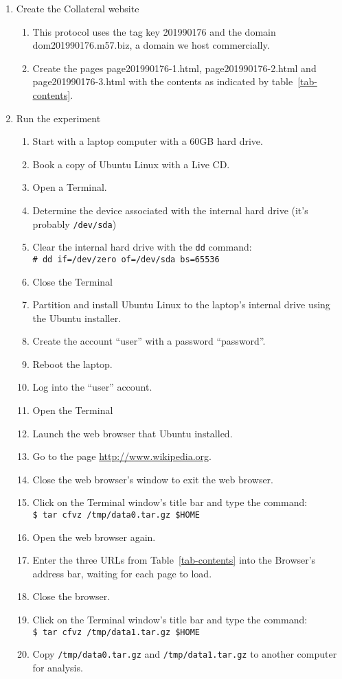 \begin{enumerate}
\item Create the Collateral website
\begin{enumerate}
\item This protocol uses the tag key 201990176 and the domain
  dom201990176.m57.biz, a domain we host commercially.
\item Create the pages page201990176-1.html, page201990176-2.html and
  page201990176-3.html with the contents as indicated by table~\ref{tab-contents}.
\end{enumerate}
\item Run the experiment
\begin{enumerate}
\item Start with a laptop computer with a 60GB hard drive.
\item Book a copy of Ubuntu Linux with a Live CD.
\item Open a Terminal. 
\item Determine the device associated with the internal hard drive
  (it's probably \verb+/dev/sda+)
\item Clear the internal hard drive with the \texttt{dd} command:\\
      \verb+# dd if=/dev/zero of=/dev/sda bs=65536+
\item Close the Terminal
\item Partition and install Ubuntu Linux to the laptop's internal
  drive using the Ubuntu installer.
\item Create the account ``user'' with a password ``password''.
\item Reboot the laptop.
\item Log into the ``user'' account.
\item Open the Terminal
\item Launch the web browser that Ubuntu installed.
\item Go to the page \url{http://www.wikipedia.org}.
\item Close the web browser's window to exit the web browser.
\item Click on the Terminal window's title bar and type the command:\\
     \verb|$ tar cfvz /tmp/data0.tar.gz $HOME|
\item Open the web browser again.
\item Enter the three URLs from Table~\ref{tab-contents} into the
  Browser's address bar, waiting for each page to load.
\item Close the browser.
\item Click on the Terminal window's title bar and type the command:\\
     \verb|$ tar cfvz /tmp/data1.tar.gz $HOME|
\item Copy \verb+/tmp/data0.tar.gz+ and \verb+/tmp/data1.tar.gz+ to
  another computer for analysis.
\end{enumerate}
\end{enumerate}

